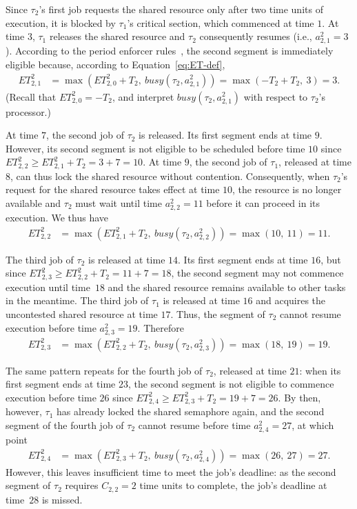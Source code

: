 Since $\tau_2$'s first job requests the shared resource only after two time units of execution, it is blocked by $\tau_1$'s critical section, which commenced at time $1$. At time $3$, $\tau_1$ releases the shared resource and $\tau_2$ consequently resumes (i.e., $a^2_{2,1} = 3$). According to the period enforcer rules~\cite{Raj:suspension1991}, the second segment is immediately eligible because, according to Equation~\ref{eq:ET-def},
\begin{align*}
	ET_{2,1}^2 & = \max\left(ET_{2,0}^2 + T_2,\ \mathit{busy}(\tau_2, a^2_{2,1})\right) =\max(-T_2 + T_2,\ 3) = 3.
\end{align*}
(Recall that $ET_{2,0}^2 = -T_2$, and interpret $\mathit{busy}(\tau_2, a^2_{2,1})$ with respect to $\tau_2$'s processor.)


At time $7$, the second job of $\tau_2$ is released. Its first segment ends at time $9$. However, its second segment is not eligible to be scheduled before time $10$ since $ET_{2,2}^2 \geq ET_{2,1}^2 + T_2 = 3 + 7 = 10$. At time $9$, the second job of $\tau_1$, released at time $8$, can thus lock the shared resource without contention. Consequently, when $\tau_2$'s request for the shared resource takes effect at time $10$, the resource is no longer available and $\tau_2$ must wait until time $a^2_{2,2} = 11$ before it can proceed in its execution. We thus have
\begin{align*}
	ET_{2,2}^2 & = \max\left(ET_{2,1}^2 + T_2,\ \mathit{busy}(\tau_2, a^2_{2,2})\right) =\max(10,\ 11) = 11.
\end{align*}

The third job of $\tau_2$ is released at time $14$. Its first segment ends at time $16$, but since $ET_{2,3}^2 \geq ET_{2,2}^2 + T_2 = 11 + 7 = 18$, the second segment may not commence execution until time~$18$ and the shared resource remains available to other tasks in the meantime. The third job of $\tau_1$ is released at time $16$ and acquires the uncontested shared resource at time $17$. Thus, the segment of $\tau_2$ cannot resume execution before time $a^2_{2,3} = 19$. Therefore
\begin{align*}
	ET_{2,3}^2 & = \max\left(ET_{2,2}^2 + T_2,\ \mathit{busy}(\tau_2, a^2_{2,3})\right) =\max(18,\ 19) = 19.
\end{align*}

The same pattern repeats for the fourth job of $\tau_2$, released at time $21$: when its first segment ends at time $23$, the second segment is not eligible to commence execution before time $26$ since $ET_{2,4}^2 \geq ET_{2,3}^2 + T_2 = 19 + 7 = 26$. By then, however, $\tau_1$ has already locked the shared semaphore again, and the second segment of the fourth job of $\tau_2$ cannot resume before time $a^2_{2,4} = 27$, at which point
\begin{align*}
	ET_{2,4}^2 & = \max\left(ET_{2,3}^2 + T_2,\ \mathit{busy}(\tau_2, a^2_{2,4})\right) =\max(26,\ 27) = 27.
\end{align*}
However, this leaves insufficient time to meet the job's deadline: as the second segment of $\tau_2$ requires $C_{2,2} = 2$ time units to complete, the job's deadline at time~$28$ is  missed.


